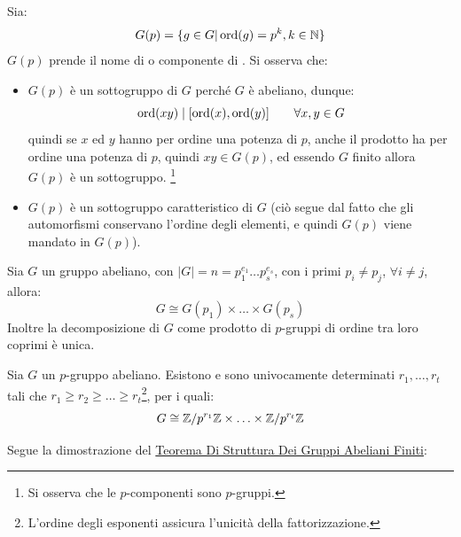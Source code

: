 \documentclass[11pt]{scrartcl}
\begin{document}
\begin{remark}
    Sia:
        \[ G(p) = \{g \in G | \operatorname{ord}(g) = p^k, k \in \mathbb N\}
            \]
    $G(p)$ prende il nome di  o componente di .
    Si osserva che:
        \begin{itemize}
            \item $G(p)$ è un sottogruppo di $G$ perché $G$ è abeliano, dunque:
                \[ \operatorname{ord}(xy) \mid [\operatorname{ord}(x),\operatorname{ord}(y)] \qquad \forall x,y \in G
                    \]
                quindi se $x$ ed $y$ hanno per ordine una potenza di $p$, anche il prodotto ha per ordine una potenza di $p$, quindi $xy \in G(p)$, ed essendo 
                $G$ finito allora $G(p)$ è un sottogruppo. \footnote{Si osserva che le $p$-componenti sono $p$-gruppi.}
            \item $G(p)$ è un sottogruppo caratteristico di $G$ (ciò segue dal fatto che gli automorfismi conservano l'ordine degli elementi, e quindi $G(p)$ viene mandato in $G(p)$).
        \end{itemize}
\end{remark}

\begin{theorem}
    \label{t:t1}
    Sia $G$ un gruppo abeliano, con $|G| = n = p_1^{e_1}\ldots p_s^{e_s}$, con i primi $p_i \ne p_j$, $\forall i \ne j$, allora:
        \[ G \cong G(p_1) \times \ldots \times G(p_s)
            \]
    Inoltre la decomposizione di $G$ come prodotto di $p$-gruppi di ordine tra loro coprimi è unica.
\end{theorem}

\begin{theorem}
    \label{t:t2}
    Sia $G$ un $p$-gruppo abeliano. Esistono e sono univocamente determinati $r_1,\ldots,r_t$ tali che $r_1 \geq r_2 \geq \ldots \geq r_t$\footnote{L'ordine
     degli esponenti assicura l'unicità della fattorizzazione.}, per i quali:
        \[ G \cong \mathbb{Z}/{p^{r_1}}\mathbb{Z} \times \ldots \times \mathbb{Z}/{p^{r_t}}\mathbb{Z}
            \]
\end{theorem}

\pagebreak

Segue la dimostrazione del \hyperref[t:struttura]{Teorema Di Struttura Dei Gruppi Abeliani Finiti}:
\end{document}

